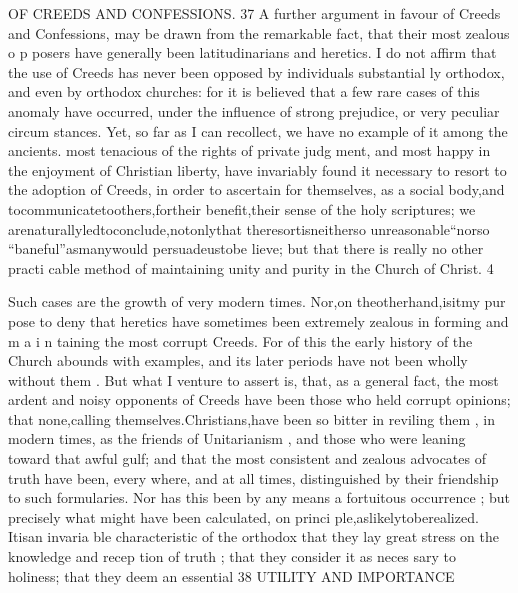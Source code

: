 \documentclass[
]{book}
\begin{document}
OF CREEDS AND CONFESSIONS. 37
A further argument in favour of Creeds and Confessions, may be drawn from the remarkable fact, that their most zealous o p posers have generally been latitudinarians and
heretics.
I do not affirm that the use of Creeds has
never been opposed by individuals substantial ly orthodox, and even by orthodox churches: for it is believed that a few rare cases of this anomaly have occurred, under the influence of strong prejudice, or very peculiar circum stances. Yet, so far as I can recollect, we have no example of it among the ancients.
most tenacious of the rights of private judg ment, and most happy in the enjoyment of
Christian liberty, have invariably found it necessary to resort to the adoption of Creeds,
in order to ascertain for themselves, as a social body,and tocommunicatetoothers,fortheir benefit,their sense of the holy scriptures;
we arenaturallyledtoconclude,notonlythat theresortisneitherso unreasonable``norso
``baneful''asmanywould persuadeustobe lieve; but that there is really no other practi cable method of maintaining unity and purity in the Church of Christ.
4

Such cases are the growth of very modern times. Nor,on theotherhand,isitmy pur pose to deny that heretics have sometimes
been extremely zealous in forming and m a i n taining the most corrupt Creeds. For of this the early history of the Church abounds with examples, and its later periods have not been wholly without them . But what I venture to assert is, that, as a general fact, the most ardent and noisy opponents of Creeds have been those who held corrupt opinions; that none,calling themselves.Christians,have been so bitter in reviling them , in modern times, as the friends of Unitarianism , and those who were leaning toward that awful gulf; and that the most consistent and zealous advocates of truth have been, every where, and at all
times, distinguished by their friendship to such formularies. Nor has this been by any
means a fortuitous occurrence ; but precisely what might have been calculated, on princi ple,aslikelytoberealized. Itisan invaria
ble characteristic of the orthodox that they lay great stress on the knowledge and recep tion of truth ; that they consider it as neces sary to holiness; that they deem an essential
38 UTILITY AND IMPORTANCE
\end{document}
